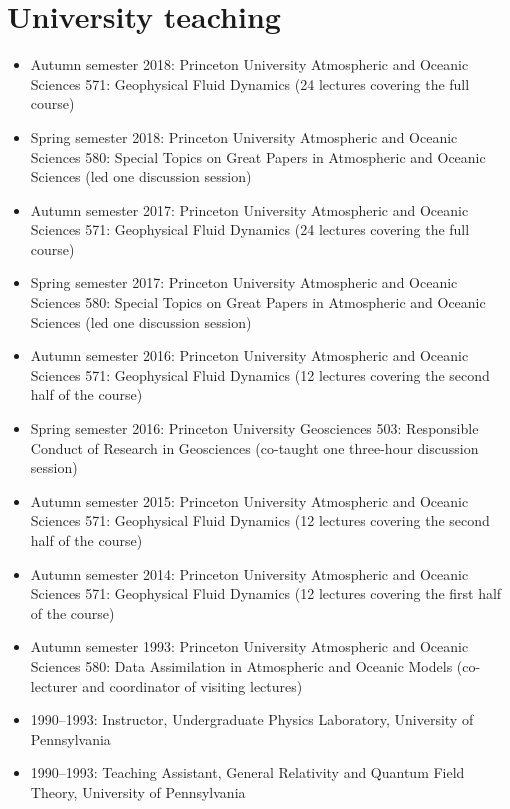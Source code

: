 \documentclass{article}
\begin{document}
\section*{\sc  \color{Maroon}  University teaching}
\vspace{-.3cm}

\begin{itemize}[leftmargin=*]

\item Autumn semester 2018: Princeton University Atmospheric and Oceanic Sciences 571: Geophysical Fluid Dynamics (24 lectures covering the full course)
    
\item Spring semester 2018: Princeton University Atmospheric and Oceanic Sciences 580: Special Topics on Great Papers in Atmospheric and Oceanic Sciences (led one discussion session)

\item Autumn semester 2017: Princeton University Atmospheric and Oceanic Sciences 571: Geophysical Fluid Dynamics (24 lectures covering the full course)
  
\item Spring semester 2017: Princeton University Atmospheric and Oceanic Sciences 580: Special Topics on Great Papers in Atmospheric and Oceanic Sciences (led one discussion session)

\item Autumn semester 2016: Princeton University Atmospheric and Oceanic Sciences 571: Geophysical Fluid Dynamics (12 lectures covering the second half of the course)

\item Spring semester 2016: Princeton University Geosciences 503:
  Responsible Conduct of Research in Geosciences (co-taught one
  three-hour discussion session)

\item Autumn semester 2015: Princeton University Atmospheric and Oceanic Sciences 571: Geophysical
  Fluid Dynamics (12 lectures covering  the second half of the course)

\item Autumn semester 2014: Princeton University Atmospheric and Oceanic Sciences 571: Geophysical
  Fluid Dynamics (12 lectures covering  the first half of the course)

\item Autumn semester 1993: Princeton University Atmospheric and Oceanic Sciences 580: Data
  Assimilation in Atmospheric and Oceanic Models (co-lecturer and
  coordinator of visiting lectures)

\item 1990--1993:  Instructor, Undergraduate Physics Laboratory,
  University of Pennsylvania 

\item 1990--1993:  Teaching Assistant,  General Relativity and
  Quantum Field Theory, University of Pennsylvania 

\end{itemize}
\end{document}
